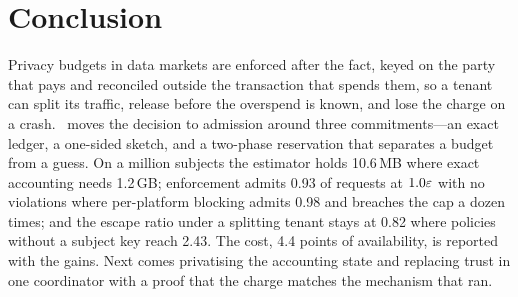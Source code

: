 \section{Conclusion}
\label{sec:conclusion}

Privacy budgets in data markets are enforced after the fact, keyed on the party that pays
and reconciled outside the transaction that spends them, so a tenant can split its traffic,
release before the overspend is known, and lose the charge on a crash. \sys\ moves the decision to admission around three commitments---an exact
ledger, a one-sided sketch, and a two-phase reservation that separates a budget from a
guess. On a million subjects the estimator holds 10.6\,MB where exact accounting needs
1.2\,GB; enforcement admits 0.93 of requests at $1.0\varepsilon$ with no violations where
per-platform blocking admits 0.98 and breaches the cap a dozen times; and the escape
ratio under a splitting tenant stays at 0.82 where policies without a subject key reach
2.43. The cost, 4.4 points of availability, is reported with the gains.
Next comes privatising the accounting state and replacing trust in one coordinator with
a proof that the charge matches the mechanism that ran.
\enlargethispage{3\baselineskip}
